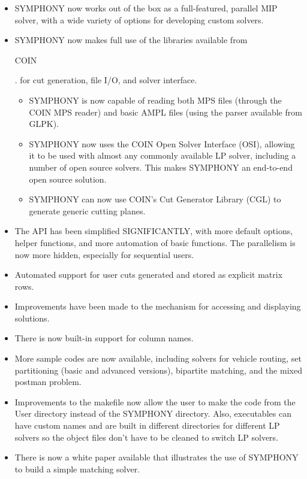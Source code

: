 \begin{itemize}

\item SYMPHONY now works out of the box as a full-featured, parallel MIP solver,
with a wide variety of options for developing custom solvers.

\item SYMPHONY now makes full use of the libraries available from 
\emph{}
\begin{latexonly} 
COIN
\end{latexonly}.
for cut generation, file I/O, and solver interface.

\begin{itemize}

    \item SYMPHONY is now capable of reading both MPS files (through the COIN MPS
reader) and basic AMPL files (using the parser available from GLPK).

    \item SYMPHONY now uses the COIN Open Solver Interface (OSI), allowing it to
be used with almost any commonly available LP solver, including a number of
open source solvers. This makes SYMPHONY an end-to-end open source solution.

    \item SYMPHONY can now use COIN's Cut Generator Library (CGL) to generate
generic cutting planes.

\end{itemize}

\item The API has been simplified SIGNIFICANTLY, with more default options,
helper functions, and more automation of basic functions. The parallelism is
now more hidden, especially for sequential users.

\item Automated support for user cuts generated and stored as explicit matrix
rows. 

\item Improvements have been made to the mechanism for accessing and displaying
solutions.

\item There is now built-in support for column names.

\item More sample codes are now available, including solvers for vehicle routing,
set partitioning (basic and advanced versions), bipartite matching, and the
mixed postman problem.

\item Improvements to the makefile now allow the user to make the code from the 
User directory instead of the SYMPHONY directory. Also, executables can have
custom names and are built in different directories for different LP solvers
so the object files don't have to be cleaned to switch LP solvers.

\item There is now a white paper available that illustrates the use of SYMPHONY
to build a simple matching solver.

\end{itemize}

